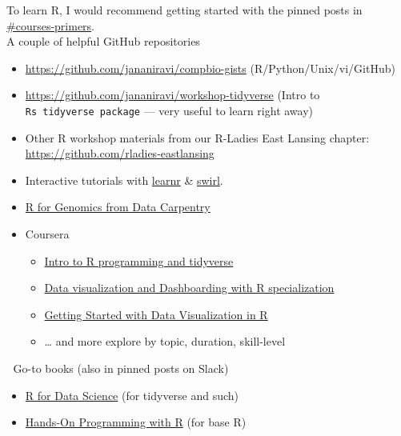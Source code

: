 \documentclass[
  letterpaper,
  DIV=11,
  numbers=noendperiod]{scrreprt}
\begin{document}
To learn R, I would recommend getting started with the pinned posts in
\href{https://jravilab.slack.com/archives/CARJ72W3U}{\#courses-primers}.\\
A couple of helpful GitHub repositories

\begin{itemize}
\item
  \url{https://github.com/jananiravi/compbio-gists}
  (R/Python/Unix/vi/GitHub)
\item
  \url{https://github.com/jananiravi/workshop-tidyverse} (Intro to
  \texttt{R\textquotesingle{}s\ tidyverse\ package} --- very useful to
  learn right away)
\item
  Other R workshop materials from our R-Ladies East Lansing chapter:
  \url{https://github.com/rladies-eastlansing}
\item
  Interactive tutorials with
  \href{https://rstudio.github.io/learnr/}{learnr} \&
  \href{https://swirlstats.com/}{swirl}.
\item
  \href{https://datacarpentry.org/R-genomics/index.html}{R for Genomics
  from Data Carpentry}
\item
  Coursera

  \begin{itemize}
  \item
    \href{https://www.coursera.org/learn/r-programming-tidyverse}{Intro
    to R programming and tidyverse}
  \item
    \href{https://www.coursera.org/specializations/jhu-data-visualization-dashboarding-with-r}{Data
    visualization and Dashboarding with R specialization}
  \item
    \href{https://www.coursera.org/learn/jhu-getting-started-data-viz-r}{Getting
    Started with Data Visualization in R}
  \item
    \ldots{} and more \textbar{} explore by topic, duration, skill-level
  \end{itemize}
\end{itemize}

📌 Go-to books (also in pinned posts on Slack)

\begin{itemize}
\item
  \href{https://r4ds.had.co.nz/}{R for Data Science} (for tidyverse and
  such)
\item
  \href{https://rstudio-education.github.io/hopr/}{Hands-On Programming
  with R} (for base R)
\end{itemize}

\end{document}
